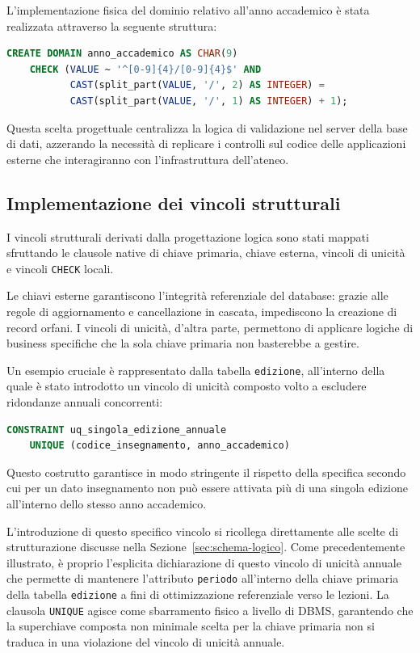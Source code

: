 L'implementazione fisica del dominio relativo all'anno accademico è stata realizzata attraverso la seguente struttura:

\begin{lstlisting}[language=SQL]
CREATE DOMAIN anno_accademico AS CHAR(9)
    CHECK (VALUE ~ '^[0-9]{4}/[0-9]{4}$' AND
           CAST(split_part(VALUE, '/', 2) AS INTEGER) =
           CAST(split_part(VALUE, '/', 1) AS INTEGER) + 1);
\end{lstlisting}

Questa scelta progettuale centralizza la logica di validazione nel server della base di dati, azzerando la necessità di replicare i controlli sul codice delle applicazioni esterne che interagiranno con l'infrastruttura dell'ateneo.

\subsection{Implementazione dei vincoli strutturali}
\label{ssec:implementazione-dei-vincoli-strutturali}

I vincoli strutturali derivati dalla progettazione logica sono stati mappati sfruttando le clausole native di chiave primaria, chiave esterna, vincoli di unicità e vincoli \texttt{CHECK} locali.

Le chiavi esterne garantiscono l'integrità referenziale del database: grazie alle regole di aggiornamento e cancellazione in cascata, impediscono la creazione di record orfani. I vincoli di unicità, d'altra parte, permettono di applicare logiche di business specifiche che la sola chiave primaria non basterebbe a gestire.

Un esempio cruciale è rappresentato dalla tabella \texttt{edizione}, all'interno della quale è stato introdotto un vincolo di unicità composto volto a escludere ridondanze annuali concorrenti:

\begin{lstlisting}[language=SQL]
CONSTRAINT uq_singola_edizione_annuale
    UNIQUE (codice_insegnamento, anno_accademico)
\end{lstlisting}

Questo costrutto garantisce in modo stringente il rispetto della specifica secondo cui per un dato insegnamento non può essere attivata più di una singola edizione all'interno dello stesso anno accademico.

L'introduzione di questo specifico vincolo si ricollega direttamente alle scelte di strutturazione discusse nella Sezione~\ref{sec:schema-logico}.
Come precedentemente illustrato, è proprio l'esplicita dichiarazione di questo vincolo di unicità annuale che permette di mantenere l'attributo \texttt{periodo} all'interno della chiave primaria della tabella \texttt{edizione} a fini di ottimizzazione referenziale verso le lezioni. La clausola \texttt{UNIQUE} agisce come sbarramento fisico a livello di DBMS, garantendo che la superchiave composta non minimale scelta per la chiave primaria non si traduca in una violazione del vincolo di unicità annuale.

